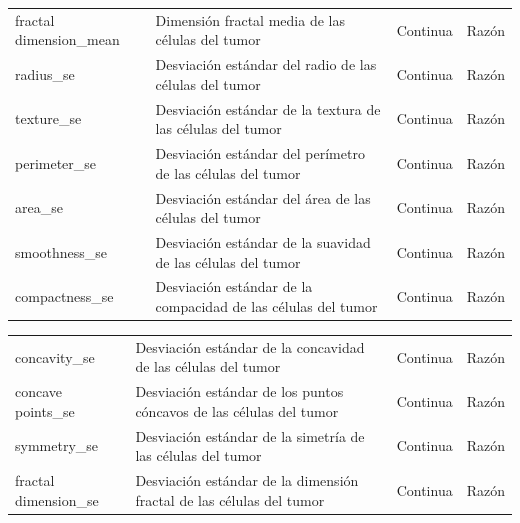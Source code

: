 \documentclass[a4paper, 12pt]{article}
\begin{document}
\begin{center}
\begin{tabular}{|p{3.5cm}|p{5.5cm}|p{3cm}|p{2.5cm}|}
            fractal dimension\_mean & Dimensión fractal media de las células del tumor & Continua & Razón \\
            
            radius\_se & Desviación estándar del radio de las células del tumor & Continua & Razón \\
            
            texture\_se & Desviación estándar de la textura de las células del tumor & Continua & Razón \\
            
            perimeter\_se & Desviación estándar del perímetro de las células del tumor & Continua & Razón \\
            
            area\_se & Desviación estándar del área de las células del tumor & Continua & Razón \\
            
            smoothness\_se & Desviación estándar de la suavidad de las células del tumor & Continua & Razón \\
            
            compactness\_se & Desviación estándar de la compacidad de las células del tumor & Continua & Razón \\
            \hline
            
        \end{tabular}
        
        \begin{tabular}{|p{3.5cm}|p{5.5cm}|p{3cm}|p{2.5cm}|}
        \hline
            
            concavity\_se & Desviación estándar de la concavidad de las células del tumor & Continua & Razón \\
            
            concave points\_se & Desviación estándar de los puntos cóncavos de las células del tumor & Continua & Razón \\
            
        
            
            symmetry\_se & Desviación estándar de la simetría de las células del tumor & Continua & Razón \\
            
            fractal dimension\_se & Desviación estándar de la dimensión fractal de las células del tumor & Continua & Razón \\
            

\end{tabular}
\end{center}
\end{document}
